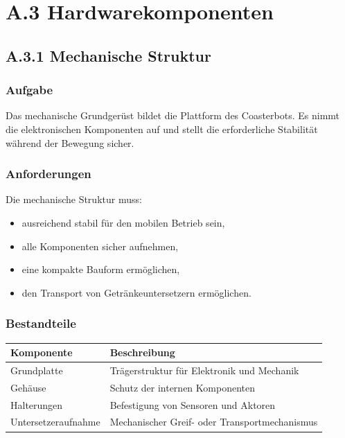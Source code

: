 \documentclass[
  a4paper,
  12pt,
  DIV=12,        %
  parskip=half,  %
  headings=small %
]{scrartcl}
\theoremstyle{definition}
\providecommand{\tightlist}{%
  \setlength{\itemsep}{0pt}\setlength{\parskip}{0pt}}
\theoremstyle{definition}
\providecommand{\tightlist}{%
  \setlength{\itemsep}{0pt}\setlength{\parskip}{0pt}}
\begin{document}
\section{A.3 Hardwarekomponenten}\label{a.3-hardwarekomponenten}

\subsection{A.3.1 Mechanische
Struktur}\label{a.3.1-mechanische-struktur}

\subsubsection{Aufgabe}\label{aufgabe}

Das mechanische Grundgerüst bildet die Plattform des Coasterbots. Es
nimmt die elektronischen Komponenten auf und stellt die erforderliche
Stabilität während der Bewegung sicher.

\subsubsection{Anforderungen}\label{anforderungen}

Die mechanische Struktur muss:

\begin{itemize}
\tightlist
\item
  ausreichend stabil für den mobilen Betrieb sein,
\item
  alle Komponenten sicher aufnehmen,
\item
  eine kompakte Bauform ermöglichen,
\item
  den Transport von Getränkeuntersetzern ermöglichen.
\end{itemize}

\subsubsection{Bestandteile}\label{bestandteile}

\begin{longtable}[]{@{}ll@{}}
\toprule\noalign{}
Komponente & Beschreibung \\
\midrule\noalign{}
\endhead
\bottomrule\noalign{}
\endlastfoot
Grundplatte & Trägerstruktur für Elektronik und Mechanik \\
Gehäuse & Schutz der internen Komponenten \\
Halterungen & Befestigung von Sensoren und Aktoren \\
Untersetzeraufnahme & Mechanischer Greif- oder Transportmechanismus \\
\end{longtable}
\end{document}
